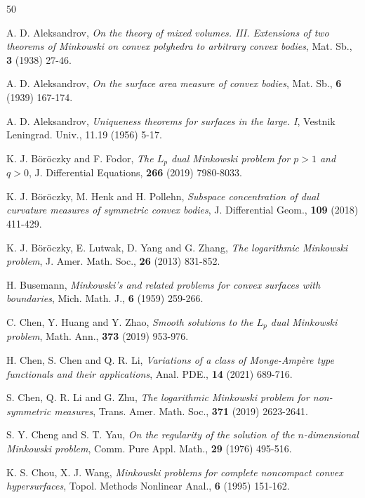 \documentclass[11pt]{amsart}
\numberwithin{equation} {section}
\numberwithin{equation}{section}
\begin{document}
\clearpage
\begin{thebibliography}{50}
\setlength{\itemsep}{-0pt} \small

 A. D. Aleksandrov, \emph{On the theory of mixed volumes. III. Extensions of two theorems of Minkowski on convex polyhedra to arbitrary convex bodies}, Mat. Sb., {\bf 3} (1938) 27-46.

 A. D. Aleksandrov, \emph{On the surface area measure of convex bodies}, Mat. Sb., {\bf 6} (1939) 167-174.

 A. D. Aleksandrov, \emph{Uniqueness theorems for surfaces in the large. I}, Vestnik Leningrad. Univ., 11.19 (1956) 5-17.

 K. J. B\"{o}r\"{o}czky and F. Fodor, \emph{The $L_p$ dual Minkowski problem for $p>1$ and $q>0$}, J. Differential Equations, {\bf266} (2019) 7980-8033.

K. J. B\"{o}r\"{o}czky, M. Henk and H. Pollehn, \emph{Subspace
  concentration of dual curvature measures of symmetric convex bodies}, J. Differential Geom., {\bf 109} (2018) 411-429.

K. J. B{\"o}r{\"o}czky, E. Lutwak, D. Yang and G. Zhang, \emph{The
  logarithmic Minkowski problem}, J. Amer. Math. Soc., {\bf 26} (2013) 831-852.

   H. Busemann, \emph{Minkowski's and related problems for convex surfaces with boundaries}, Mich. Math. J., {\bf 6} (1959) 259-266.
  
C. Chen, Y. Huang and Y. Zhao, \emph{Smooth solutions to the $L_p$ dual Minkowski problem}, Math. Ann., {\bf 373} (2019) 953-976.

 H. Chen, S. Chen and Q. R. Li, \emph{Variations of a class of Monge-Amp\`ere type functionals and their applications}, Anal. PDE., {\bf 14} (2021) 689-716.

 S. Chen, Q. R. Li and G. Zhu, \emph{The logarithmic Minkowski problem for non-symmetric measures}, Trans. Amer. Math. Soc., {\bf 371} (2019) 2623-2641.

 S. Y. Cheng and S. T. Yau, \emph{On the regularity of the solution of the $n$-dimensional Minkowski problem}, Comm. Pure Appl. Math., {\bf 29} (1976) 495-516.

 K. S. Chou, X. J. Wang, \emph{Minkowski problems for complete noncompact convex hypersurfaces}, Topol. Methods Nonlinear Anal., {\bf 6} (1995) 151-162.


\end{thebibliography}
\end{document}
